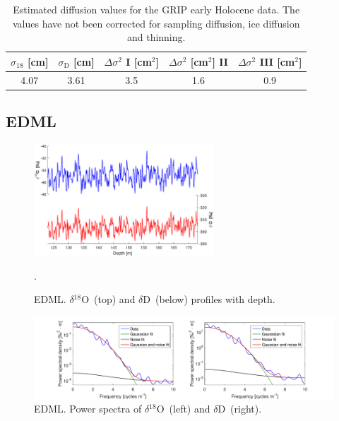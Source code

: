 \documentclass[11pt, draftcls, onecolumn]{IEEEtran} %
\numberwithin{equation}{section}
\numberwithin{table}{section}
\numberwithin{figure}{section}
\newcommand{\delOx}{$\delta{}^{18}\mathrm{O}$}
\newcommand{\delD}{$\delta\mathrm{D}$}
\begin{document}
\begin{appendices}
\begin{table}[H]
	\center
	\caption{Estimated diffusion values for the GRIP early Holocene data.
		The values have not been corrected for sampling diffusion, ice diffusion and thinning.}
	\label{GRIP_early_holo}
	\begin{tabular}{c c c c c} 
		\toprule
		$\sigma_{18}$ [cm] & $\sigma_\mathrm{D}$ [cm] & $\Delta\sigma^2$ I [cm$^2$] & $\Delta\sigma^2$ [cm$^2$] II & $\Delta\sigma^2$ III [cm$^2$] \\
		\midrule
		  4.07 &   3.61 &     3.5 &     1.6 &     0.9 \\
		\bottomrule		
	\end{tabular}
\end{table}


\clearpage
\subsection{EDML}

\begin{figure}[H]
	\vspace*{2mm}
	\begin{center}
		\includegraphics[width=0.6\textwidth]{Figure_42}
		\caption{EDML. \delOx~(top) and \delD~(below) profiles with depth.}  \label{fig:EDML}.
	\end{center}
\end{figure}

\begin{figure}[H]
	\vspace*{2mm}
	\centering
	\includegraphics[width=1\textwidth]{Figure_43}
	\caption{EDML. Power spectra of \delOx~(left) and \delD~(right).}  \label{fig:EDML_fig_1}
\end{figure}


\end{appendices}
\end{document}
